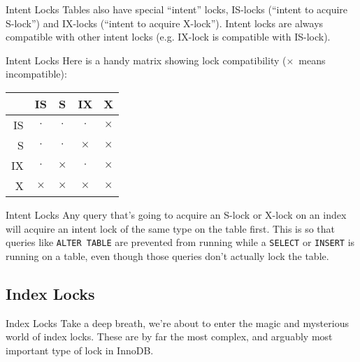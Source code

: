 \documentclass[14pt]{beamer}
\begin{document}
\begin{frame}{Intent Locks}
  Tables also have special ``intent'' locks, IS-locks (``intent to acquire
  S-lock'') and IX-locks (``intent to acquire X-lock'').
  \newline
  \newline
  Intent locks are always compatible with other intent locks (e.g. IX-lock is
  compatible with IS-lock).
\end{frame}

\begin{frame}{Intent Locks}
  Here is a handy matrix showing lock compatibility ($\times$~means
  incompatible):
  \begin{table}[ht]
    \begin{tabular}{r|c c c c}
        & IS       & S        & IX       & X        \\ \hline
     IS & $\cdot$  & $\cdot$  & $\cdot$  & $\times$ \\
     S  & $\cdot$  & $\cdot$  & $\times$ & $\times$ \\
     IX & $\cdot$  & $\times$ & $\cdot$  & $\times$ \\
     X  & $\times$ & $\times$ & $\times$ & $\times$ \\
    \end{tabular}
  \end{table}
\end{frame}

\begin{frame}{Intent Locks}
  Any query that's going to acquire an S-lock or X-lock on an index will acquire
  an intent lock of the same type on the table first.
  \newline
  \newline
  This is so that queries
  like \texttt{ALTER TABLE} are prevented from running while a \texttt{SELECT}
  or \texttt{INSERT} is running on a table, even though those queries don't
  actually lock the table.
\end{frame}

\subsection{Index Locks}

\begin{frame}{Index Locks}
  Take a deep breath, we're about to enter the magic and mysterious world of index locks.
  \newline
  \newline
  These are by far the most complex, and arguably most important type of lock in InnoDB.
\end{frame}
\end{document}
